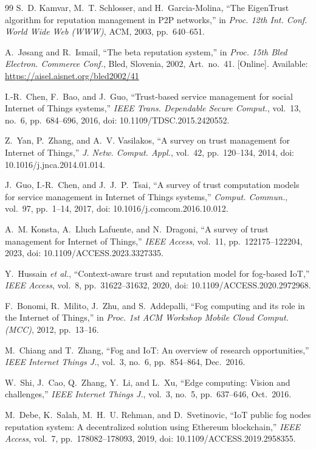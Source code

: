 \documentclass{ieeeaccess}
\begin{document}
\begin{thebibliography}{99}
S.~D. Kamvar, M.~T. Schlosser, and H.~Garcia-Molina,
``The EigenTrust algorithm for reputation management in P2P networks,''
in \textit{Proc. 12th Int. Conf. World Wide Web (WWW)},
ACM, 2003, pp.~640--651.

 A.~J{\o}sang and R.~Ismail, ``The beta reputation system,'' in \emph{Proc. 15th Bled Electron. Commerce Conf.}, Bled, Slovenia, 2002, Art.~no.~41. [Online]. Available: \url{https://aisel.aisnet.org/bled2002/41}

 I.-R.~Chen, F.~Bao, and J.~Guo, ``Trust-based service management for social Internet of Things systems,'' \emph{IEEE Trans. Dependable Secure Comput.}, vol.~13, no.~6, pp.~684--696, 2016, doi: 10.1109/TDSC.2015.2420552.

Z.~Yan, P.~Zhang, and A.~V. Vasilakos,
``A survey on trust management for Internet of Things,''
\textit{J. Netw. Comput. Appl.}, vol.~42, pp.~120--134, 2014,
doi: 10.1016/j.jnca.2014.01.014.

 J.~Guo, I.-R.~Chen, and J.~J.~P.~Tsai, ``A survey of trust computation models for service management in Internet of Things systems,'' \emph{Comput. Commun.}, vol.~97, pp.~1--14, 2017, doi: 10.1016/j.comcom.2016.10.012.

A.~M. Konsta, A.~Lluch Lafuente, and N.~Dragoni,
``A survey of trust management for Internet of Things,''
\textit{IEEE Access}, vol.~11, pp.~122175--122204, 2023,
doi: 10.1109/ACCESS.2023.3327335.

Y.~Hussain \textit{et al.},
``Context-aware trust and reputation model for fog-based IoT,''
\textit{IEEE Access}, vol.~8, pp.~31622--31632, 2020,
doi: 10.1109/ACCESS.2020.2972968.

F.~Bonomi, R.~Milito, J.~Zhu, and S.~Addepalli,
``Fog computing and its role in the Internet of Things,''
in \textit{Proc. 1st ACM Workshop Mobile Cloud Comput. (MCC)},
2012, pp.~13--16.

M.~Chiang and T.~Zhang,
``Fog and IoT: An overview of research opportunities,''
\textit{IEEE Internet Things J.}, vol.~3, no.~6,
pp.~854--864, Dec.~2016.

W.~Shi, J.~Cao, Q.~Zhang, Y.~Li, and L.~Xu,
``Edge computing: Vision and challenges,''
\textit{IEEE Internet Things J.}, vol.~3, no.~5,
pp.~637--646, Oct.~2016.

M.~Debe, K.~Salah, M.~H.~U. Rehman, and D.~Svetinovic,
``IoT public fog nodes reputation system: A decentralized solution
using Ethereum blockchain,''
\textit{IEEE Access}, vol.~7, pp.~178082--178093, 2019,
doi: 10.1109/ACCESS.2019.2958355.


\end{thebibliography}
\end{document}
